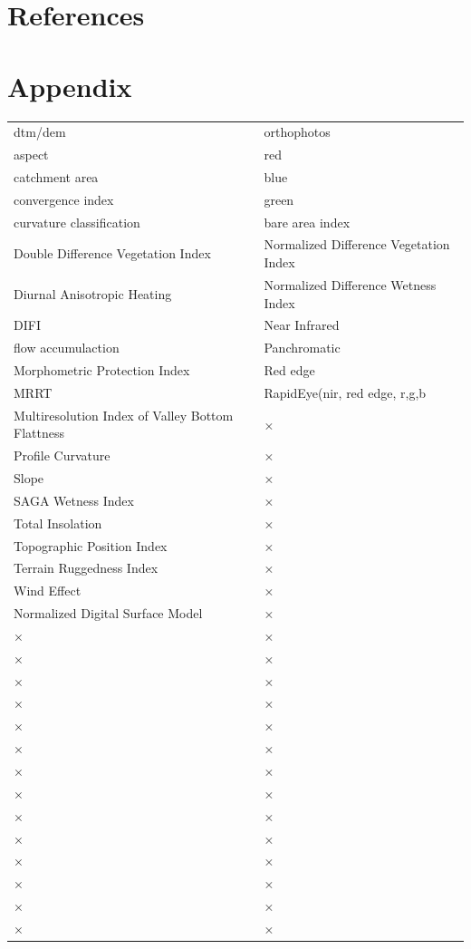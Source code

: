 \documentclass[authoryear,review,12pt,number]{elsarticle}
\begin{document}
\section{References}

\section{Appendix}
\begin{center}
\begin{tabular}{ll}
\label{tab:indices}
dtm/dem & orthophotos\\
aspect & red\\
catchment area & blue\\
convergence index & green\\
curvature classification & bare area index\\
Double Difference Vegetation Index & Normalized Difference Vegetation Index\\
Diurnal Anisotropic Heating & Normalized Difference Wetness Index\\
DIFI & Near Infrared\\
flow accumulaction & Panchromatic\\
Morphometric Protection Index & Red edge\\
MRRT & RapidEye(nir, red edge, r,g,b\\
Multiresolution Index of Valley Bottom Flattness & ×\\
Profile Curvature & ×\\
Slope & ×\\
SAGA Wetness Index & ×\\
Total Insolation & ×\\
Topographic Position Index & ×\\
Terrain Ruggedness Index & ×\\
Wind Effect & ×\\
Normalized Digital Surface Model & ×\\
× & ×\\
× & ×\\
× & ×\\
× & ×\\
× & ×\\
× & ×\\
× & ×\\
× & ×\\
× & ×\\
× & ×\\
× & ×\\
× & ×\\
× & ×\\
× & ×
\end{tabular}
\end{center}
\end{document}

